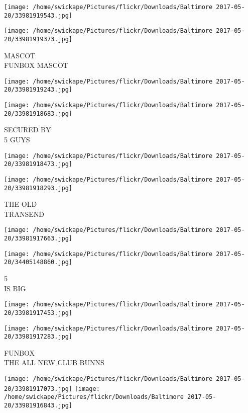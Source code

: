 \documentclass[10pt,letterpaper]{article}
\begin{document}
\texttt{[image: /home/swickape/Pictures/flickr/Downloads/Baltimore 2017-05-20/33981919543.jpg]}

\vspace{0.25in}
\texttt{[image: /home/swickape/Pictures/flickr/Downloads/Baltimore 2017-05-20/33981919373.jpg]}

MASCOT\\
FUNBOX MASCOT
\pagebreak

\texttt{[image: /home/swickape/Pictures/flickr/Downloads/Baltimore 2017-05-20/33981919243.jpg]}

\vspace{0.25in}
\texttt{[image: /home/swickape/Pictures/flickr/Downloads/Baltimore 2017-05-20/33981918683.jpg]}

SECURED BY\\
5 GUYS
\pagebreak

\texttt{[image: /home/swickape/Pictures/flickr/Downloads/Baltimore 2017-05-20/33981918473.jpg]}

\vspace{0.25in}
\texttt{[image: /home/swickape/Pictures/flickr/Downloads/Baltimore 2017-05-20/33981918293.jpg]}

THE OLD\\
TRANSEND
\pagebreak

\texttt{[image: /home/swickape/Pictures/flickr/Downloads/Baltimore 2017-05-20/33981917663.jpg]}

\vspace{0.25in}
\texttt{[image: /home/swickape/Pictures/flickr/Downloads/Baltimore 2017-05-20/34405148860.jpg]}

5\\
IS BIG
\pagebreak

\texttt{[image: /home/swickape/Pictures/flickr/Downloads/Baltimore 2017-05-20/33981917453.jpg]}

\vspace{0.25in}
\texttt{[image: /home/swickape/Pictures/flickr/Downloads/Baltimore 2017-05-20/33981917283.jpg]}

FUNBOX\\
THE ALL NEW CLUB BUNNS
\pagebreak

\texttt{[image: /home/swickape/Pictures/flickr/Downloads/Baltimore 2017-05-20/33981917073.jpg]}
\texttt{[image: /home/swickape/Pictures/flickr/Downloads/Baltimore 2017-05-20/33981916843.jpg]}
\end{document}
